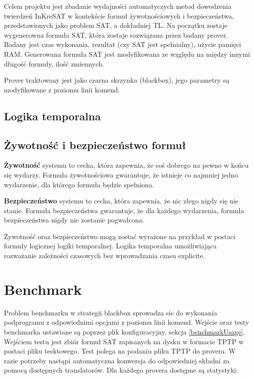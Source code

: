 \documentclass[a4paper,12pt]{article}
\begin{document}
Celem projektu jest zbadanie wydajności automatyczych metod dowodzenia twierdzeń InKreSAT w kontekście formuł żywotnościowych i bezpieczeństwa, przedstawionych jako problem \gls{SAT}, a dokładniej \gls{TL}. Na początku zostaje wygenerowna formuła \gls{SAT}, która zostaje rozwiązana przez badany prover. Badany jest czas wykonania, rezultat (czy \gls{SAT} jest spełnialny), użycie pamięci RAM.  Generowana formuła \gls{SAT} jest modyfikowana ze względu na między innymi długość formuły, ilość zmiennych.

Prover traktowany jest jako czarna skrzynka (blackbox), jego parametry są modyfikowane z poziomu linii komend.

\subsection{Logika temporalna}

\subsection{Żywotność i bezpieczeństwo formuł}

\textbf{Żywotność} systemu to cecha, która zapewnia, że coś dobrego na pewno w końcu się wydarzy. Formuła żywotnościowa gwarantuje, że istnieje co najmniej jedno wydarzenie, dla którego formuła będzie spełniona.

\textbf{Bezpieczeństwo} systemu to cecha, która zapewnia, że nic złego nigdy się nie stanie. Formuła bezpieczeństwa gwarantuje, że dla każdego wydarzenia, formuła bezpieczeństwa nigdy nie zostanie pogwałcona.

Żywotność oraz bezpieczeństwo mogą zostać wyrażone na przykład w postaci formuły logicznej logiki temporalnej. Logika temporalna umożliwiająca rozważanie zależności czasowych bez wprowadzania czasu explicite.

\section{Benchmark}

Problem benchmarku w strategii blackbox sprowadza sie do wykonania podprogramu z odpowiednimi opcjami z poziomu linii komend.
Wejście oraz testy benchmarka ustawiane są poprzez plik konfiguracyjny, sekcja \ref{benchmarkUsage}.  Wejściem testu jest zbiór formuł \gls{SAT} zapisanych na dysku w formacie TPTP w postaci pliku tesktowego. Test polega na podaniu pliku TPTP do provera. W razie potrzeby nastąpi automatyczna konwersja do odpowiedniej składni za pomocą dostępnych translatorów.
Dla każdego provera dostępne są statystyki:
\end{document}
